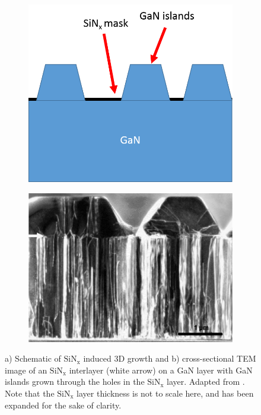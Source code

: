 \begin{figure}[th]
	\begin{subfigure}[b]{0.48\textwidth}
		\centering
		\includegraphics[width=1\linewidth]{Figs/Ch6/3D}
		\caption{}
		
	\end{subfigure}%
	\hspace*{0.6cm}
	\begin{subfigure}[b]{0.48\textwidth}
		\centering
		\includegraphics[width=1\linewidth]{Figs/Ch6/3D2}
		\caption{}
	\end{subfigure}%
	
	\caption{a) Schematic of $\mathrm{SiN_{x}}$ induced 3D growth and b) cross-sectional TEM image of an $\mathrm{SiN_{x}}$ interlayer (white arrow) on a GaN layer with GaN islands grown through the holes in the $\mathrm{SiN_{x}}$ layer. Adapted from \cite{Kappers2007}. Note that the $\mathrm{SiN_{x}}$ layer thickness is not to scale here, and has been expanded for the sake of clarity.}
	\label{3Dgrowth}
\end{figure}
\FloatBarrier

